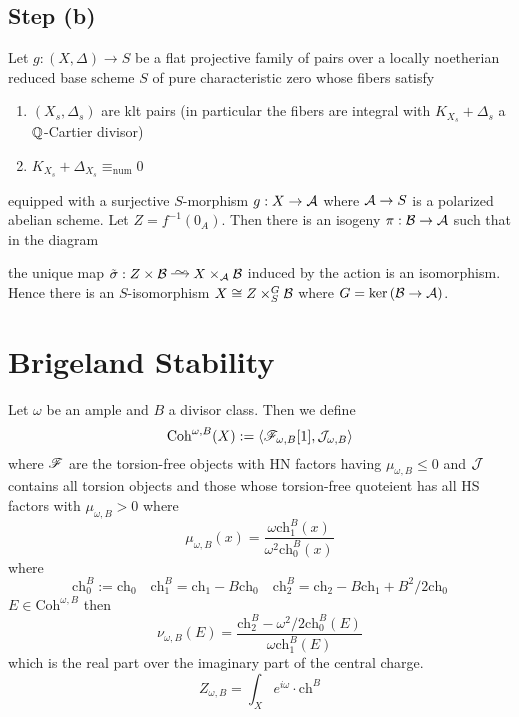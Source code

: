 \documentclass[12pt]{article}
\begin{document}
\subsection{Step (b)}

\begin{theorem} \label{thm:abelian_decomposition}
Let $g : (X, \Delta) \to S$ be a flat projective family of pairs over a locally noetherian reduced base scheme $S$ of pure characteristic zero whose fibers satisfy
\begin{enumerate}
\item $(X_s, \Delta_s)$ are klt pairs (in particular the fibers are integral with $K_{X_s} + \Delta_s$ a $\mathbb{Q}$-Cartier divisor) 
\item $K_{X_s} + \Delta_{X_s} \equiv_{\text{num}} 0$ 
\end{enumerate}
equipped with a surjective $S$-morphism $g : X \to \mathcal{A}$ where $\mathcal{A} \to S$ is a polarized abelian scheme. Let $Z = f^{-1}(0_A)$. Then there is an isogeny $\pi : \mathcal{B} \to \mathcal{A}$ such that in the diagram
\begin{center}
\end{center}
the unique map $\tilde{\sigma} : Z \times \cB \iso X \times_{\cA} \cB$ induced by the action is an isomorphism. Hence there is an $S$-isomorphism $X \cong Z \times^G_S \mathcal{B}$ where $G = \ker{(\mathcal{B}\to \mathcal{A})}$.
\end{theorem}

\section{Brigeland Stability}


\renewcommand{\Coh}{\mathrm{Coh}}
\renewcommand{\ch}{\mathrm{ch}}

Let $\omega$ be an ample and $B$ a divisor class. Then we define
\[ \Coh^{\omega, B}(X) := \left< \F_{\omega, B}[1], \J_{\omega,B} \right> \]
where $\mathscr{F}$ are the torsion-free objects with HN factors having $\mu_{\omega, B} \le 0$ and $\mathcal{J}$ contains all torsion objects and those whose torsion-free quoteient has all HS factors with $\mu_{\omega, B} > 0$ where
\[ \mu_{\omega,B}(x) = \frac{\omega \ch_1^B(x)}{\omega^2 \ch_0^B(x)} \]
where
\[ \ch_0^B := \ch_0 \quad \ch_1^B = \ch_1 - B \ch_0 \quad \ch_2^B = \ch_2 - B \ch_1 + B^2/2 \ch_0 \]
$E \in \Coh^{\omega, B}$ then 
\[ \nu_{\omega, B}(E) = \frac{\ch_2^B - \omega^2/2 \ch_0^B(E)}{\omega \ch_1^B(E)} \]
which is the real part over the imaginary part of the central charge. 
\[ Z_{\omega, B} = \int_X e^{i \omega} \cdot \ch^B \]
\end{document}

